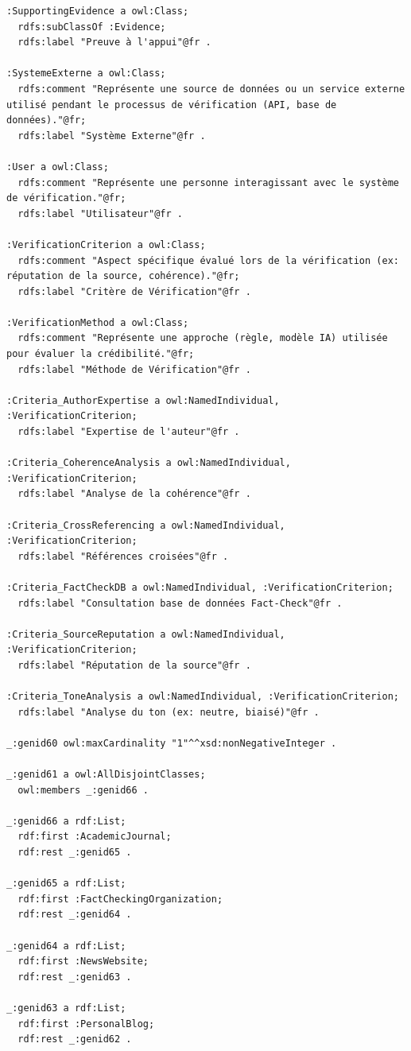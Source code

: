 \documentclass[9pt,twocolumn,french]{article}
\begin{document}
\begin{lstlisting}[language=Turtle,basicstyle=\ttfamily\tiny,frame=single]
:SupportingEvidence a owl:Class;
  rdfs:subClassOf :Evidence;
  rdfs:label "Preuve à l'appui"@fr .

:SystemeExterne a owl:Class;
  rdfs:comment "Représente une source de données ou un service externe utilisé pendant le processus de vérification (API, base de données)."@fr;
  rdfs:label "Système Externe"@fr .

:User a owl:Class;
  rdfs:comment "Représente une personne interagissant avec le système de vérification."@fr;
  rdfs:label "Utilisateur"@fr .

:VerificationCriterion a owl:Class;
  rdfs:comment "Aspect spécifique évalué lors de la vérification (ex: réputation de la source, cohérence)."@fr;
  rdfs:label "Critère de Vérification"@fr .

:VerificationMethod a owl:Class;
  rdfs:comment "Représente une approche (règle, modèle IA) utilisée pour évaluer la crédibilité."@fr;
  rdfs:label "Méthode de Vérification"@fr .

:Criteria_AuthorExpertise a owl:NamedIndividual, :VerificationCriterion;
  rdfs:label "Expertise de l'auteur"@fr .

:Criteria_CoherenceAnalysis a owl:NamedIndividual, :VerificationCriterion;
  rdfs:label "Analyse de la cohérence"@fr .

:Criteria_CrossReferencing a owl:NamedIndividual, :VerificationCriterion;
  rdfs:label "Références croisées"@fr .

:Criteria_FactCheckDB a owl:NamedIndividual, :VerificationCriterion;
  rdfs:label "Consultation base de données Fact-Check"@fr .

:Criteria_SourceReputation a owl:NamedIndividual, :VerificationCriterion;
  rdfs:label "Réputation de la source"@fr .

:Criteria_ToneAnalysis a owl:NamedIndividual, :VerificationCriterion;
  rdfs:label "Analyse du ton (ex: neutre, biaisé)"@fr .

_:genid60 owl:maxCardinality "1"^^xsd:nonNegativeInteger .

_:genid61 a owl:AllDisjointClasses;
  owl:members _:genid66 .

_:genid66 a rdf:List;
  rdf:first :AcademicJournal;
  rdf:rest _:genid65 .

_:genid65 a rdf:List;
  rdf:first :FactCheckingOrganization;
  rdf:rest _:genid64 .

_:genid64 a rdf:List;
  rdf:first :NewsWebsite;
  rdf:rest _:genid63 .

_:genid63 a rdf:List;
  rdf:first :PersonalBlog;
  rdf:rest _:genid62 .


\end{lstlisting}
\end{document}
